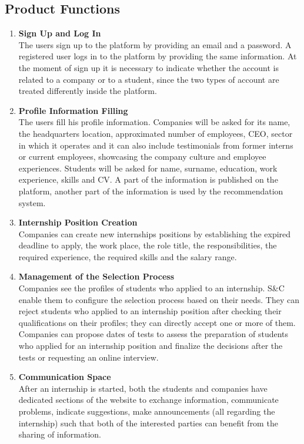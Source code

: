 

\subsection{Product Functions}
    \begin{enumerate}
        \item \textbf {Sign Up and Log In}
        \\ The users sign up to the platform by providing an email and a password. A registered user logs in to the platform by providing the same information. At the moment of sign up it is necessary to indicate whether the account is related to a company or to a student, since the two types of account are treated differently inside the platform.
        \item \textbf {Profile Information Filling}
        \\ The users fill his profile information. Companies will be asked for its name, the headquarters location, approximated number of employees, CEO, sector in which it operates and it can also include testimonials from former interns or current employees, showcasing the company culture and employee experiences. Students will be asked for name, surname, education, work experience, skills and CV. A part of the information is published on the platform, another part of the information is used by the recommendation system.
        \item \textbf {Internship Position Creation}
        \\ Companies can create new internships positions by establishing the expired deadline to apply, the work place, the role title, the responsibilities, the required experience, the required skills and the salary range.
        \item \textbf {Management of the Selection Process}
        \\ Companies see the profiles of students who applied to an internship. S\&C enable them to configure the selection process based on their needs. They can reject students who applied to an internship position after checking their qualifications on their profiles; they can directly accept one or more of them. Companies can propose dates of tests to assess the preparation of students who applied for an internship position and finalize the decisions after the tests or requesting an online interview.
        \item \textbf {Communication Space}
        \\ After an internship is started, both the students and companies have dedicated sections of the website to exchange information, communicate problems, indicate suggestions, make announcements (all regarding the internship) such that both of the interested parties can benefit from the sharing of information. 

\end{enumerate}
